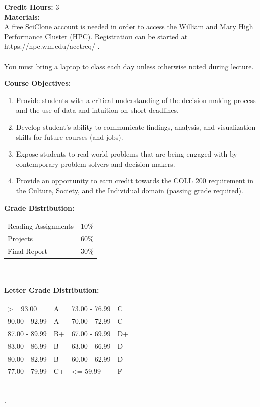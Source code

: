 \documentclass[11pt]{article}
\begin{document}
\textbf {Credit Hours:} 3 \\

\textbf {\large Materials:}\\ 
A free SciClone account is needed in order to access the William and Mary High Performance Cluster (HPC).  Registration can be started at https://hpc.wm.edu/acctreq/ . \\
\\
You must bring a laptop to class  each day unless otherwise noted during lecture.


\vspace{8mm}

\textbf {\large Course Objectives:} 
\begin{enumerate} \itemsep-0.4em
  \item Provide students with a critical understanding of the decision making process and the use of data and intuition on short deadlines.
  \item Develop student’s ability to communicate findings, analysis, and visualization skills for future courses (and jobs).
  \item Expose students to real-world problems that are being engaged with by contemporary problem solvers and decision makers.
  \item Provide an opportunity to earn credit towards the COLL 200 requirement in the Culture, Society, and the Individual domain (passing grade required).
\end{enumerate}
\vspace{8mm}

\textbf {\large Grade Distribution:} \\
\hspace*{40mm}
\begin{tabular}{ l l }
Reading Assignments & 10\% \\
Projects & 60\% \\
Final Report & 30\%\\
\end{tabular} \\\\

\textbf {\large Letter Grade Distribution:} \\
\hspace*{40mm}
\begin{tabular}{ l l | l l }
\textgreater= 93.00 & A & 73.00 - 76.99 & C \\
90.00 - 92.99 & A-  & 70.00 - 72.99 & C- \\
87.00 - 89.99 & B+  & 67.00 - 69.99 & D+ \\
83.00 - 86.99 & B  & 63.00 - 66.99 & D \\
80.00 - 82.99 & B-  & 60.00 - 62.99 & D- \\
77.00 - 79.99 & C+  & \textless= 59.99 & F \\
\end{tabular} \\
.\\
\end{document}
